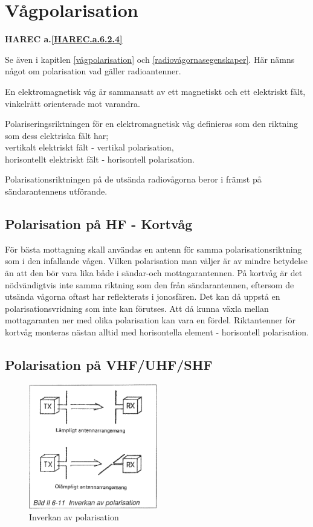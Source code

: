 \section{Vågpolarisation}
\textbf{
HAREC a.\ref{HAREC.a.6.2.4}\label{myHAREC.a.6.2.4}
}

Se även i kapitlen \ref{vågpolarisation} och \ref{radiovågornasegenskaper}.
Här nämns något om polarisation vad gäller radioantenner.

En elektromagnetisk våg är sammansatt av ett magnetiskt och ett
elektriskt fält, vinkelrätt orienterade mot varandra.

Polariseringsriktningen för en elektromagnetisk våg definieras som den riktning
som dess elektriska fält har; \\
vertikalt elektriskt fält - vertikal polarisation, \\
horisontellt elektriskt fält - horisontell polarisation.

Polarisationsriktningen på de utsända radiovågorna beror i främst på
sändarantennens utförande.

\subsection{Polarisation på HF - Kortvåg}
För bästa mottagning skall användas en antenn för samma
polarisationsriktning som i den infallande vågen. Vilken polarisation
man väljer är av mindre betydelse än att den bör vara lika både i
sändar-och mottagarantennen. På kortvåg är det nödvändigtvis inte
samma riktning som den från sändarantennen, eftersom de utsända
vågorna oftast har reflekterats i jonosfären. Det kan då uppstå en
polarisationsvridning som inte kan förutses. Att då kunna växla mellan
mottagaranten ner med olika polarisation kan vara en
fördel. Riktantenner för kortvåg monteras nästan alltid med
horisontella element - horisontell polarisation.

\subsection{Polarisation på VHF/UHF/SHF}

\begin{figure}
  \includegraphics[width=0.5\textwidth]{images/bild_2_6-11}
  \caption{Inverkan av polarisation}
  \label{fig:bildII6-11}
\end{figure}

